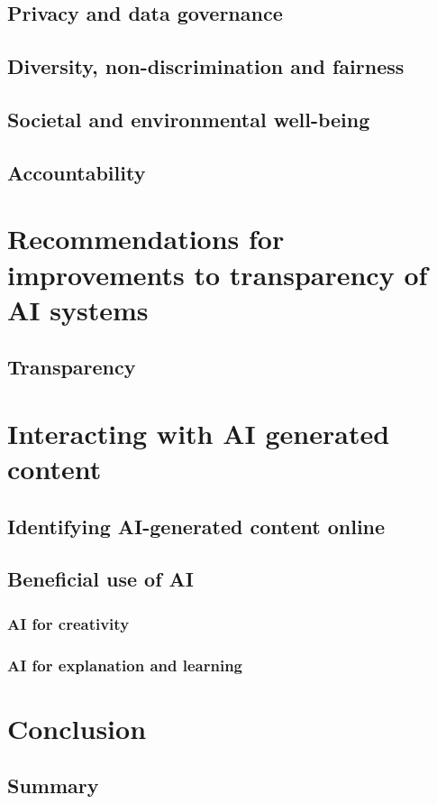 \begin{refsegment}
    \subsection*{Privacy and data governance}
    \subsection*{Diversity, non-discrimination and fairness}
    \subsection*{Societal and environmental well-being}
    \subsection*{Accountability}

\section{Recommendations for improvements to transparency of AI systems}
    \subsection*{Transparency} %

\section{Interacting with AI generated content}
    \subsection*{Identifying AI-generated content online}

    \subsection*{Beneficial use of AI}
        \subsubsection*{AI for creativity}
        \subsubsection*{AI for explanation and learning}

\section{Conclusion}
    \subsection*{Summary}

\printbibliography[heading=subbibliography,segment=\therefsegment,resetnumbers=true]

\end{refsegment}